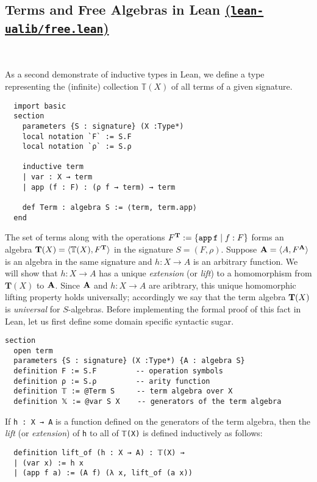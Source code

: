 \documentclass[11pt]{amsart}  %
\begin{document}
\subsection{Terms and Free Algebras in Lean \href{https://github.com/UniversalAlgebra/lean-ualib/blob/master/src/free.lean}{(\lstinline{lean-ualib/free.lean})}}\

\noindent As a second demonstrate of inductive types in Lean, 
we define a type representing the (infinite) 
collection $\mathbb T (X)$ of all terms of a given signature.
\begin{lstlisting}
  import basic
  section
    parameters {S : signature} (X :Type*) 
    local notation `F` := S.F
    local notation `ρ` := S.ρ 
  
    inductive term
    | var : X → term
    | app (f : F) : (ρ f → term) → term

    def Term : algebra S := ⟨term, term.app⟩
  end
\end{lstlisting}
The set of terms along with the operations $F^{\mathbf{T}} := \{\mathtt{app \,f} \mid f : F\}$ forms an algebra $\mathbf{T}(X) = \langle \mathbb T(X), F^{\mathbf{T}}\rangle$ in the signature $S = (F, \rho)$. Suppose $\mathbf{A} = \langle A, F^{\mathbf{A}}\rangle$ is an algebra in the same signature and $h \colon X \to A$ is an arbitrary function.  We will show that $h \colon X \to A$ has a unique \emph{extension} (or \emph{lift}) to a homomorphism from $\mathbf T(X)$ to $\mathbf{A}$.  Since $\mathbf{A}$ and $h \colon X \to A$ are aribtrary, this unique homomorphic lifting property holds universally; accordingly we say that the term algebra $\mathbf{T}(X)$ is \emph{universal} for $S$-algebras.
Before implementing the formal proof of this fact in Lean, let us first define some domain specific syntactic sugar.
\begin{lstlisting}
section
  open term
  parameters {S : signature} (X :Type*) {A : algebra S}
  definition F := S.F         -- operation symbols
  definition ρ := S.ρ         -- arity function
  definition 𝕋 := @Term S     -- term algebra over X
  definition 𝕏 := @var S X    -- generators of the term algebra
\end{lstlisting}
If \lstinline{h : X → A} is a function defined on the generators
of the term algebra, then the \emph{lift} (or \emph{extension}) of  \lstinline{h} 
to all of \lstinline{𝕋(X)} is defined inductively as follows:
\begin{lstlisting}
  definition lift_of (h : X → A) : 𝕋(X) → 
  | (var x) := h x
  | (app f a) := (A f) (λ x, lift_of (a x))
\end{lstlisting}
\end{document}
